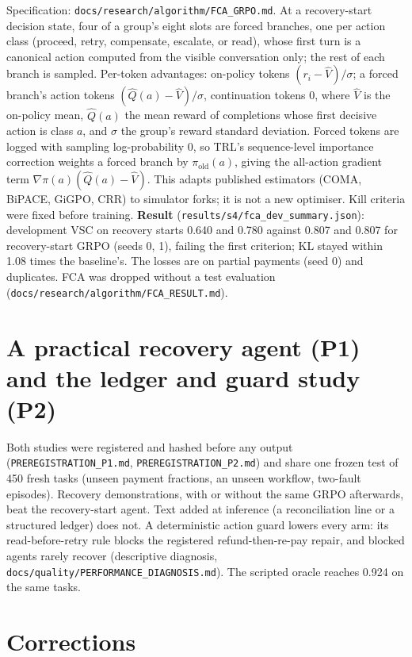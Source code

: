 Specification: \texttt{docs/research/algorithm/FCA\_GRPO.md}. At a recovery-start decision state, four of a group's eight slots are forced branches, one per action class (proceed, retry, compensate, escalate, or read), whose first turn is a canonical action computed from the visible conversation only; the rest of each branch is sampled. Per-token advantages: on-policy tokens $(r_i-\hat V)/\sigma$; a forced branch's action tokens $(\hat Q(a)-\hat V)/\sigma$, continuation tokens 0, where $\hat V$ is the on-policy mean, $\hat Q(a)$ the mean reward of completions whose first decisive action is class $a$, and $\sigma$ the group's reward standard deviation. Forced tokens are logged with sampling log-probability 0, so TRL's sequence-level importance correction weights a forced branch by $\pi_{\text{old}}(a)$, giving the all-action gradient term $\nabla\pi(a)(\hat Q(a)-\hat V)$. This adapts published estimators (COMA, BiPACE, GiGPO, CRR) to simulator forks; it is not a new optimiser. Kill criteria were fixed before training. \textbf{Result} (\texttt{results/s4/fca\_dev\_summary.json}): development VSC on recovery starts 0.640 and 0.780 against 0.807 and 0.807 for recovery-start GRPO (seeds 0, 1), failing the first criterion; KL stayed within 1.08 times the baseline's. The losses are on partial payments (seed 0) and duplicates. FCA was dropped without a test evaluation (\texttt{docs/research/algorithm/FCA\_RESULT.md}).

\section{A practical recovery agent (P1) and the ledger and guard study (P2)}
Both studies were registered and hashed before any output (\texttt{PREREGISTRATION\_P1.md}, \texttt{PREREGISTRATION\_P2.md}) and share one frozen test of 450 fresh tasks (unseen payment fractions, an unseen workflow, two-fault episodes). Recovery demonstrations, with or without the same GRPO afterwards, beat the recovery-start agent. Text added at inference (a reconciliation line or a structured ledger) does not. A deterministic action guard lowers every arm: its read-before-retry rule blocks the registered refund-then-re-pay repair, and blocked agents rarely recover (descriptive diagnosis, \texttt{docs/quality/PERFORMANCE\_DIAGNOSIS.md}). The scripted oracle reaches 0.924 on the same tasks.



\section{Corrections}
\label{app:corr}

